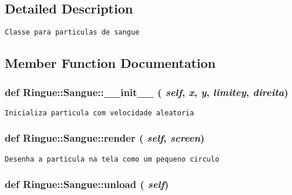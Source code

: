 \subsection{Detailed Description}


\begin{footnotesize}\begin{verbatim}Classe para particulas de sangue\end{verbatim}
\end{footnotesize}
 

\subsection{Member Function Documentation}
\hypertarget{class_ringue_1_1_sangue_44a8690011bc18b7a8950defe8cc426f}{
\subsubsection[{\_\-\_\-init\_\-\_\-}]{\setlength{\rightskip}{0pt plus 5cm}def Ringue::Sangue::\_\-\_\-init\_\-\_\- ( {\em self}, \/   {\em x}, \/   {\em y}, \/   {\em limitey}, \/   {\em direita})}}
\label{class_ringue_1_1_sangue_44a8690011bc18b7a8950defe8cc426f}




\begin{footnotesize}\begin{verbatim}Inicializa particula com velocidade aleatoria \end{verbatim}
\end{footnotesize}
 \hypertarget{class_ringue_1_1_sangue_a2c55aba76a9fcafd4324738c450ff88}{
\subsubsection[{render}]{\setlength{\rightskip}{0pt plus 5cm}def Ringue::Sangue::render ( {\em self}, \/   {\em screen})}}
\label{class_ringue_1_1_sangue_a2c55aba76a9fcafd4324738c450ff88}




\begin{footnotesize}\begin{verbatim}Desenha a particula na tela como um pequeno circulo \end{verbatim}
\end{footnotesize}
 \hypertarget{class_ringue_1_1_sangue_ea6f65ab9835bb9fda4caff21083fe66}{
\subsubsection[{unload}]{\setlength{\rightskip}{0pt plus 5cm}def Ringue::Sangue::unload ( {\em self})}}
\label{class_ringue_1_1_sangue_ea6f65ab9835bb9fda4caff21083fe66}




